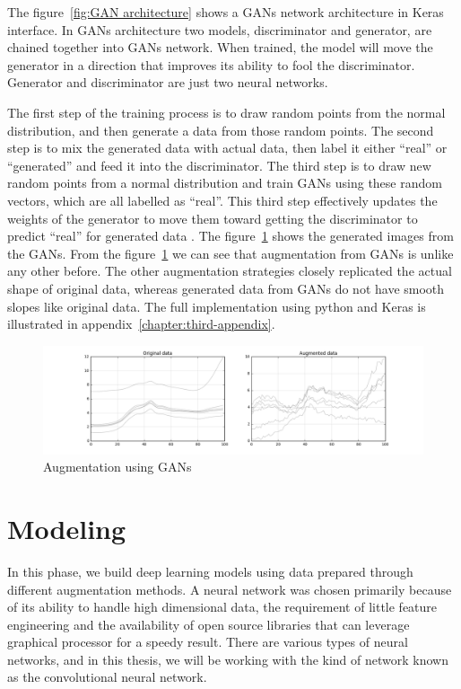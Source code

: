 The figure~\ref{fig:GAN architecture} shows a GANs network architecture in Keras interface. In GANs architecture two models, discriminator and generator, are chained together into GANs network. When trained, the model will move the generator in a direction that improves its ability to fool the discriminator. Generator and discriminator are just two neural networks.

The first step of the training process is to draw random points from the normal distribution, and then generate a data from those random points. The second step is to mix the generated data with actual data, then label it either ``real'' or ``generated'' and feed it into the discriminator. The third step is to draw new random points from a normal distribution and train GANs using these random vectors, which are all labelled as ``real''. This third step effectively updates the weights of the generator to move them toward getting the discriminator to predict ``real'' for generated data \citep{chollet2017deep}. The figure~\ref{fig:GANs augmentation} shows the generated images from the GANs. From the figure~\ref{fig:GANs augmentation} we can see that augmentation from GANs is unlike any other before. The other augmentation strategies closely replicated the actual shape of original data, whereas generated data from GANs do not have smooth slopes like original data. The full implementation using python and Keras is illustrated in appendix~\ref{chapter:third-appendix}.


\begin{figure}[ht]
	\begin{center}
		\includegraphics[width=\textwidth]{images/gan_augment.png}
		\caption{Augmentation using GANs}
		\label{fig:GANs augmentation}
	\end{center}
\end{figure}

\section{Modeling}
In this phase, we build deep learning models using data prepared through different augmentation methods. A neural network was chosen primarily because of its ability to handle high dimensional data, the requirement of little feature engineering and the availability of open source libraries that can leverage graphical processor for a speedy result. There are various types of neural networks, and in this thesis, we will be working with the kind of network known as the convolutional neural network.

